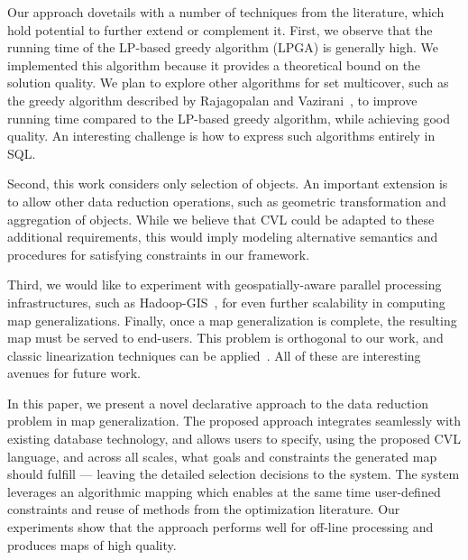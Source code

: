 \documentclass[11pt, oneside]{report}
\begin{document}
{Our approach dovetails with a number of techniques from the literature, which hold potential to further extend or complement it. First, we observe that the running time of the LP-based greedy algorithm (LPGA) is generally high. We implemented this algorithm because it provides a theoretical bound on the solution quality. We plan to explore other algorithms for set multicover, such as the greedy algorithm described by Rajagopalan and Vazirani~\cite{rajagopalan1998primal}, to improve running time compared to the LP-based greedy algorithm, while achieving good quality. An interesting challenge is how to express such algorithms entirely in SQL.

Second, this work considers only selection of objects. An important extension is to allow other data reduction operations, such as geometric transformation and aggregation of objects. While we believe that CVL could be adapted to these additional requirements, this would imply modeling alternative semantics and procedures for satisfying constraints in our framework.

Third, we would like to experiment with geospatially-aware parallel processing infrastructures, such as Hadoop-GIS~\cite{Aji:2013:HadoopGIS}, for even further scalability in computing map generalizations. Finally, once a map generalization is complete, the resulting map must be served to end-users. This problem is orthogonal to our work, and classic linearization techniques can be applied~\cite{hilbert1891ueber}. All of these are interesting avenues for future work.


In this paper, we present a novel declarative approach to the data reduction problem in map generalization. 
The proposed approach integrates seamlessly with existing database technology, and allows users to specify, using the proposed CVL language, and across all scales, what goals and constraints the generated map should fulfill --- leaving the detailed selection decisions to the system. The system leverages an algorithmic mapping which enables at the same time user-defined constraints and reuse of methods from the optimization literature. Our experiments show that the approach performs well for off-line processing and produces maps of high quality.



}
\end{document}
